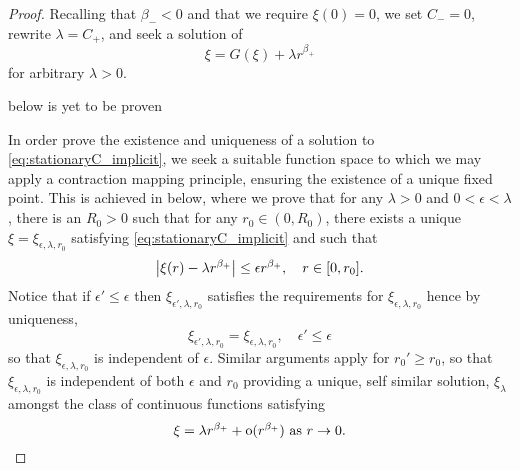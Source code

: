 \documentclass{amsart}
\begin{document}
\begin{proof}
Recalling that \(\beta_- < 0\) and that we require \(\xi(0) = 0\), we set \(C_- = 0\), rewrite \(\lambda = C_+\), and seek a solution of
\begin{equation}
\label{eq:stationaryC_implicit}
\xi = G(\xi) + \lambda r^{\beta_+}
\end{equation}
for arbitrary \(\lambda > 0\).

{\color{red}  below is yet to be proven}

In order prove the existence and uniqueness of a solution to \eqref{eq:stationaryC_implicit}, we seek a suitable function space to which we may apply a contraction mapping principle, ensuring the existence of a unique fixed point. This is achieved in  below, where we prove that for any \(\lambda > 0\) and \(0 < \epsilon < \lambda\), there is an \(R_0 > 0\) such that for any \(r_0 \in (0, R_0)\), there exists a unique \(\xi = \xi_{\epsilon, \lambda, r_0}\) satisfying \eqref{eq:stationaryC_implicit} and such that
\[
\left|{\xi(r) - \lambda r^{\beta_+}}\right| \leq \epsilon r^{\beta_+}, \quad r \in [0, r_0].
\]
Notice that if \(\epsilon' \leq \epsilon\) then \(\xi_{\epsilon', \lambda, r_0}\) satisfies the requirements for \(\xi_{\epsilon, \lambda, r_0}\) hence by uniqueness,
\[
\xi_{\epsilon', \lambda, r_0} = \xi_{\epsilon, \lambda, r_0}, \quad \epsilon' \leq \epsilon
\]
so that \(\xi_{\epsilon, \lambda, r_0}\) is independent of \(\epsilon\). Similar arguments apply for \(r_0' \geq r_0\), so that \(\xi_{\epsilon, \lambda, r_0}\) is independent of both \(\epsilon\) and \(r_0\) providing a unique, self similar solution, \(\xi_{\lambda}\) amongst the class of continuous functions satisfying
\[
\xi = \lambda r^{\beta_+} + \operatorname{o}(r^{\beta_+}) \text{ as } r \to 0.
\]
\end{proof}
\end{document}
